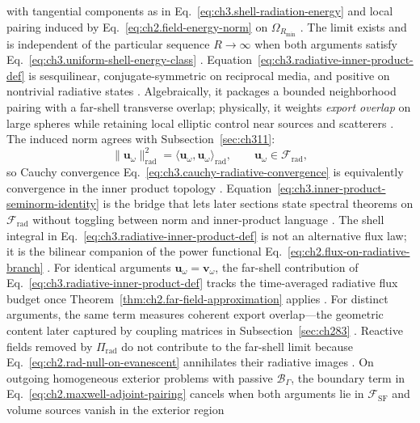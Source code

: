 with tangential components as in Eq.~\eqref{eq:ch3.shell-radiation-energy} and local pairing induced by
Eq.~\eqref{eq:ch2.field-energy-norm} on \(\Omega_{R_{\min}}\) \cite{stratton1941}. The limit
exists and is independent of the particular sequence \(R\to\infty\) when both arguments satisfy
Eq.~\eqref{eq:ch3.uniform-shell-energy-class} \cite{stratton1941}. Equation~\eqref{eq:ch3.radiative-inner-product-def}
is sesquilinear, conjugate-symmetric on reciprocal media, and positive on nontrivial radiative states
\cite{stratton1941}. Algebraically, it packages a bounded neighborhood pairing with a
far-shell transverse overlap; physically, it weights \emph{export overlap} on large spheres while retaining
local elliptic control near sources and scatterers \cite{jackson1999}.
The induced norm agrees with Subsection~\ref{sec:ch311}:
\begin{equation}
\label{eq:ch3.inner-product-seminorm-identity}
\|\mathbf{u}_\omega\|_{\mathrm{rad}}^{2}
=
\langle \mathbf{u}_\omega,\mathbf{u}_\omega\rangle_{\mathrm{rad}},
\qquad
\mathbf{u}_\omega\in\mathcal{F}_{\mathrm{rad}},
\end{equation}
so Cauchy convergence Eq.~\eqref{eq:ch3.cauchy-radiative-convergence} is equivalently convergence in the
inner product topology \cite{stratton1941}. Equation~\eqref{eq:ch3.inner-product-seminorm-identity} is the
bridge that lets later sections state spectral theorems on \(\mathcal{F}_{\mathrm{rad}}\) without toggling
between norm and inner-product language \cite{harrington2001}.
The shell integral in Eq.~\eqref{eq:ch3.radiative-inner-product-def} is not an alternative flux law; it is
the bilinear companion of the power functional Eq.~\eqref{eq:ch2.flux-on-radiative-branch}
\cite{stratton1941}. For identical arguments \(\mathbf{u}_\omega=\mathbf{v}_\omega\), the
far-shell contribution of Eq.~\eqref{eq:ch3.radiative-inner-product-def} tracks the time-averaged radiative
flux budget once Theorem~\ref{thm:ch2.far-field-approximation} applies \cite{stratton1941}. For
distinct arguments, the same term measures coherent export overlap---the geometric content later captured by
coupling matrices in Subsection~\ref{sec:ch283} \cite{harrington2001}. Reactive fields removed by
\(\Pi_{\mathrm{rad}}\) do not contribute to the far-shell limit because
Eq.~\eqref{eq:ch2.rad-null-on-evanescent} annihilates their radiative images
\cite{stratton1941}.
On outgoing homogeneous exterior problems with passive \(\mathcal{B}_\Gamma\), the boundary term in
Eq.~\eqref{eq:ch2.maxwell-adjoint-pairing} cancels when both arguments lie in
\(\mathcal{F}_{\mathrm{SF}}\) and volume sources vanish in the exterior region
